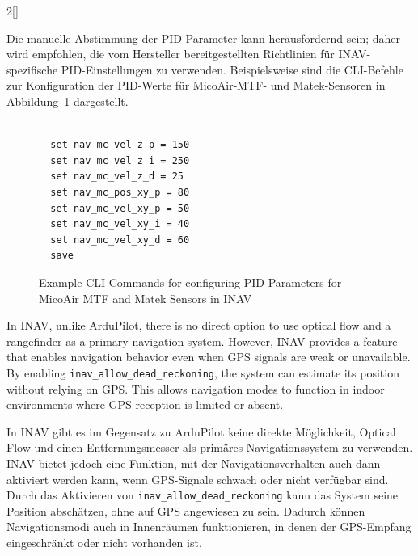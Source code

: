 \begin{paracol}{2}[]
\colger

Die manuelle Abstimmung der PID-Parameter kann herausfordernd sein; daher wird empfohlen, die vom Hersteller bereitgestellten Richtlinien für INAV-spezifische PID-Einstellungen zu verwenden. Beispielsweise sind die CLI-Befehle zur Konfiguration der PID-Werte für MicoAir-MTF- und Matek-Sensoren in Abbildung~\ref{INAVCliCommandsMicoAirAndMatek} dargestellt.

\colende

\begin{figure}
\begin{lstlisting}[style=shell]

  set nav_mc_vel_z_p = 150
  set nav_mc_vel_z_i = 250
  set nav_mc_vel_z_d = 25 
  set nav_mc_pos_xy_p = 80
  set nav_mc_vel_xy_p = 50
  set nav_mc_vel_xy_i = 40
  set nav_mc_vel_xy_d = 60
  save

\end{lstlisting}
\caption{Example CLI Commands for configuring PID Parameters for MicoAir MTF and Matek Sensors in INAV}
\label{INAVCliCommandsMicoAirAndMatek}
\end{figure}
\FloatBarrier

\renewcommand{\deutschertitel}{Konfigurationsschritt E: Optical Flow und Entfernungsmesser für die Navigation aktivieren}
\renewcommand{\englischertitel}{Configuration Step E: Enabling Optical Flow and Rangefinder for Navigation}
\makrounterunterabschnitt

In INAV, unlike ArduPilot, there is no direct option to use optical flow and a rangefinder as a primary navigation system. However, INAV provides a feature that enables navigation behavior even when GPS signals are weak or unavailable. By enabling \verb!inav_allow_dead_reckoning!, the system can estimate its position without relying on GPS. This allows navigation modes to function in indoor environments where GPS reception is limited or absent.

\colger

In INAV gibt es im Gegensatz zu ArduPilot keine direkte Möglichkeit, Optical Flow und einen Entfernungsmesser als primäres Navigationssystem zu verwenden. INAV bietet jedoch eine Funktion, mit der Navigationsverhalten auch dann aktiviert werden kann, wenn GPS-Signale schwach oder nicht verfügbar sind. Durch das Aktivieren von \verb!inav_allow_dead_reckoning! kann das System seine Position abschätzen, ohne auf GPS angewiesen zu sein. Dadurch können Navigationsmodi auch in Innenräumen funktionieren, in denen der GPS-Empfang eingeschränkt oder nicht vorhanden ist.


\end{paracol}
